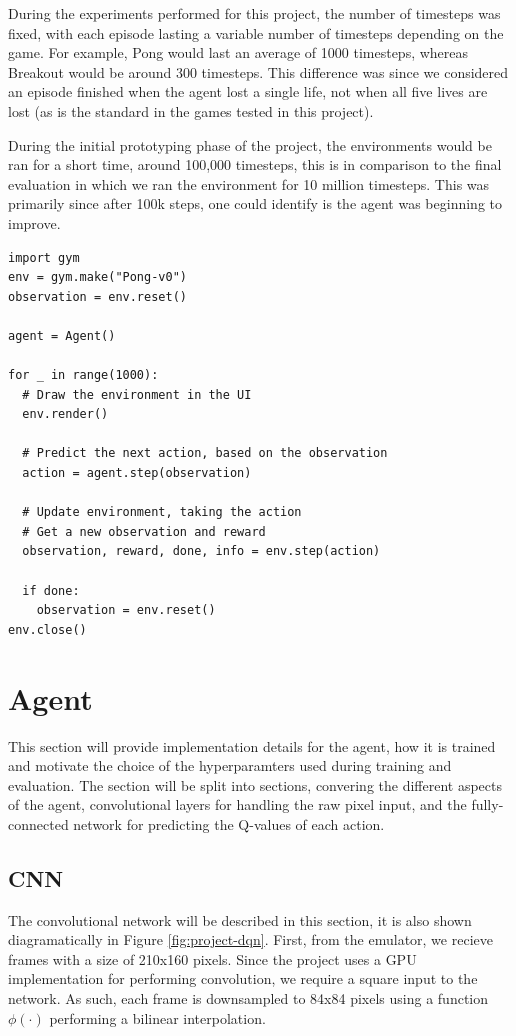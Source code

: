 During the experiments performed for this project, the number of timesteps was fixed, with each episode lasting a variable number of timesteps depending on the game. For example, Pong would last an average of 1000 timesteps, whereas Breakout would be around 300 timesteps. This difference was since we considered an episode finished when the agent lost a single life, not when all five lives are lost (as is the standard in the games tested in this project).

During the initial prototyping phase of the project, the environments would be ran for a short time, around 100,000 timesteps, this is in comparison to the final evaluation in which we ran the environment for 10 million timesteps. This was primarily since after 100k steps, one could identify is the agent was beginning to improve.

\begin{code}
	\label{code:basic-gym}
	\begin{verbatim}
import gym
env = gym.make("Pong-v0")
observation = env.reset()

agent = Agent()

for _ in range(1000):
  # Draw the environment in the UI
  env.render()

  # Predict the next action, based on the observation
  action = agent.step(observation)

  # Update environment, taking the action
  # Get a new observation and reward
  observation, reward, done, info = env.step(action)

  if done:
    observation = env.reset()
env.close()
\end{verbatim}
\end{code}

\section{Agent}
This section will provide implementation details for the agent, how it is trained and motivate the choice of the hyperparamters used during training and evaluation. The section will be split into sections, convering the different aspects of the agent, convolutional layers for handling the raw pixel input, and the fully-connected network for predicting the Q-values of each action.

\subsection{CNN}
\label{imple:cnn}
The convolutional network will be described in this section, it is also shown diagramatically in Figure \ref{fig:project-dqn}. First, from the emulator, we recieve frames with a size of 210x160 pixels. Since the project uses a GPU implementation for performing convolution, we require a square input to the network. As such, each frame is downsampled to 84x84 pixels using a function $\phi(\cdot)$ performing a bilinear interpolation.

